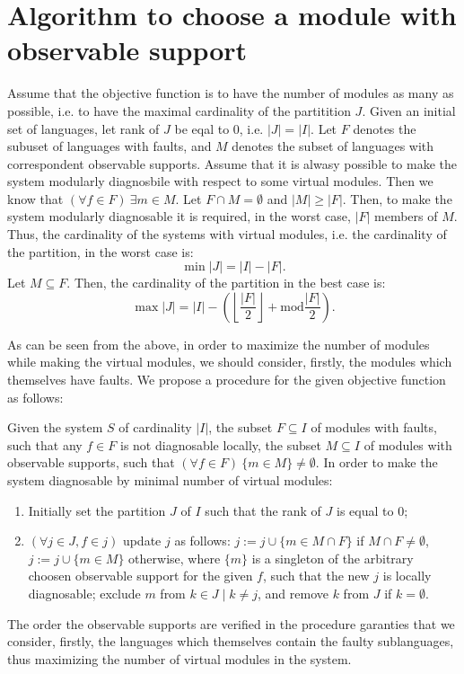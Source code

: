 \documentclass[a4paper, 10pt, conference]{ieeeconf}
\begin{document}
\section{Algorithm to choose a module with observable support}
Assume that the objective function is to have the number of modules as many as
possible, i.e. to have the maximal cardinality of the partitition $J$.
Given an initial set of languages, let rank of $J$ be eqal to 0, i.e. $|J| =
|I|$. Let $F$ denotes the subuset of languages with faults, and $M$ denotes the
subset of languages with correspondent observable supports.
Assume that it is alwasy possible to make the system modularly diagnosbile with
respect to some virtual modules. Then we know that $(\forall f \in F)~\exists m
\in M$. Let $F \cap M = \emptyset$ and $|M| \geq |F|$. Then, to make the system
modularly diagnosable it is required, in the worst case, $|F|$ members of $M$.
Thus, the cardinality of the systems with virtual modules, i.e. the cardinality
of the partition, in the worst case is:
\begin{equation}
	\min |J| = |I| - |F|.
\end{equation}
Let $M \subseteq F$. Then, the cardinality of the partition in the best case
is:
\begin{equation}
	\max |J| = |I| - \left(
		\left\lfloor \frac{|F|}{2} \right\rfloor + \textrm{mod} \frac{|F|}{2}
		\right). 
\end{equation}

As can be seen from the above, in order to maximize the number of modules while
making the virtual modules, we should consider, firstly, the modules which
themselves have faults. We propose a procedure for the given objective function
as follows:

Given the system $S$ of cardinality $|I|$, the subset $F
\subseteq I$ of modules with faults, such that any $f\in F$ is not diagnosable
locally, the subset $M \subseteq I$ of modules with observable supports, such
that $(\forall f \in F)~\{m \in M\}\neq \emptyset$. In order to make the system
diagnosable by minimal number of virtual modules:
\begin{enumerate}
  \item Initially set the partition $J$ of $I$ such that the rank of $J$ is
  equal to 0;
  \item $(\forall j \in J, f \in j)$ update $j$ as follows: 
  	$j := j \cup \{m \in M \cap F\}$ if $M \cap F \neq \emptyset$,
 $j := j \cup \{m \in M\}$ otherwise, where $\{m\}$ is a singleton of the
 arbitrary choosen observable support for the given $f$, such that the new $j$
 is locally diagnosable; exclude $m$ from $k \in J \mid k \neq j$, and remove
 $k$ from $J$ if $k=\emptyset$.
\end{enumerate} 
The order the observable supports are verified in the procedure garanties that
we consider, firstly, the languages which themselves contain the faulty
sublanguages, thus maximizing the number of virtual modules in the system.
\end{document}
